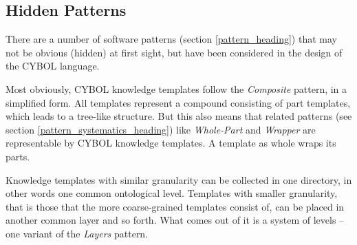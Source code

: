%
%
%
%
%
%
%

\subsection{Hidden Patterns}
\label{hidden_patterns_heading}

There are a number of software patterns (section \ref{pattern_heading}) that
may not be obvious (hidden) at first sight, but have been considered in the
design of the CYBOL language.

Most obviously, CYBOL knowledge templates follow the \emph{Composite} pattern,
in a simplified form. All templates represent a compound consisting of part
templates, which leads to a tree-like structure. But this also means that related
patterns (see section \ref{pattern_systematics_heading}) like \emph{Whole-Part}
and \emph{Wrapper} are representable by CYBOL knowledge templates. A template
as whole wraps its parts.

Knowledge templates with similar granularity can be collected in one directory,
in other words one common ontological level. Templates with smaller granularity,
that is those that the more coarse-grained templates consist of, can be placed
in another common layer and so forth. What comes out of it is a system of levels
-- one variant of the \emph{Layers} pattern.
